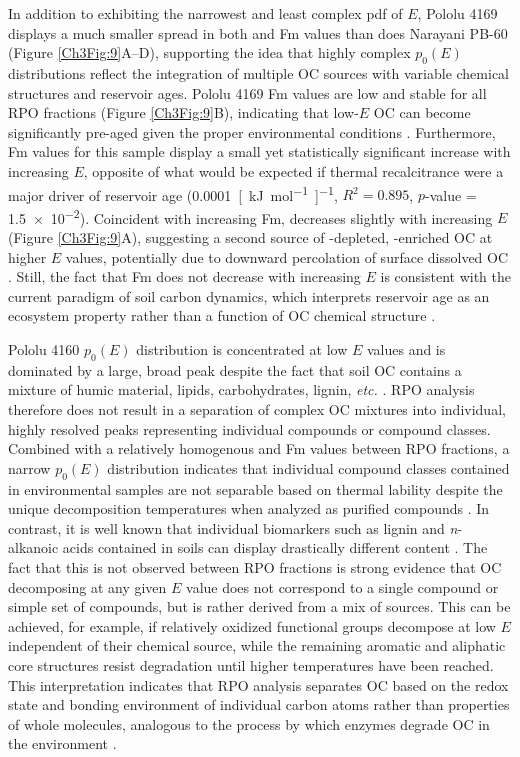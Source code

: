 In addition to exhibiting the narrowest and least complex pdf of $E$, Pololu 4169 displays a much smaller spread in both  and Fm values than does Narayani PB-60 (Figure \ref{Ch3Fig:9}A--D), supporting the idea that highly complex $p_{0}(E)$ distributions reflect the integration of multiple OC sources with variable chemical structures and reservoir ages. Pololu 4169 Fm values are low and stable for all RPO fractions (Figure \ref{Ch3Fig:9}B), indicating that low-$E$ OC can become significantly pre-aged given the proper environmental conditions \citep{Schmidt:2011gg}. Furthermore, Fm values for this sample display a small yet statistically significant increase with increasing $E$, opposite of what would be expected if thermal recalcitrance were a major driver of reservoir age (\SI{0.0001}{[kJ.mol^{-1}]^{-1}}, $R^{2} = 0.895$, $p$-value = \num{1.5e-2}). Coincident with increasing Fm,  decreases slightly with increasing $E$ (Figure \ref{Ch3Fig:9}A), suggesting a second source of -depleted, -enriched OC at higher $E$ values, potentially due to downward percolation of surface dissolved OC \citep{Chadwick:2007hc}. Still, the fact that Fm does not decrease with increasing $E$ is consistent with the current paradigm of soil carbon dynamics, which interprets reservoir age as an ecosystem property rather than a function of OC chemical structure \citep{Mikutta:2006gx,Janssens:2010hd,Schmidt:2011gg}. 

Pololu 4160 $p_{0}(E)$ distribution is concentrated at low $E$ values and is dominated by a large, broad peak despite the fact that soil OC contains a mixture of humic material, lipids, carbohydrates, lignin, \textit{etc.} \citep[Figure \ref{Ch3Fig:8}C;][]{Helfrich:2007ej}. RPO analysis therefore does not result in a separation of complex OC mixtures into individual, highly resolved peaks representing individual compounds or compound classes. Combined with a relatively homogenous  and Fm values between RPO fractions, a narrow $p_{0}(E)$ distribution indicates that individual compound classes contained in environmental samples are not separable based on thermal lability despite the unique decomposition temperatures when analyzed as purified compounds \citep{Williams:2014bq}. In contrast, it is well known that individual biomarkers such as lignin and \textit{n}-alkanoic acids contained in soils can display drastically different  content \citep[see][for review]{Schmidt:2011gg}. The fact that this is not observed between RPO fractions is strong evidence that OC decomposing at any given $E$ value does not correspond to a single compound or simple set of compounds, but is rather derived from a mix of sources. This can be achieved, for example, if relatively oxidized functional groups decompose at low $E$ independent of their chemical source, while the remaining aromatic and aliphatic core structures resist degradation until higher temperatures have been reached. This interpretation indicates that RPO analysis separates OC based on the redox state and bonding environment of individual carbon atoms rather than properties of whole molecules, analogous to the process by which enzymes degrade OC in the environment \citep{Sinsabaugh:2008il}. 

